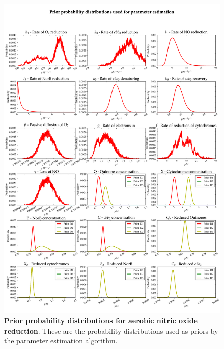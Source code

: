 \begin{figure}[tbp]
 \centering
 \includegraphics[width=15cm, trim=0cm 0cm 0cm 0cm]{./06-noreduction/data/aer-no-priors.pdf}
 \caption[Prior probability distributions for aerobic nitric oxide reduction]{{\bf Prior probability distributions for aerobic nitric oxide reduction}. These are the probability distributions used as priors by the parameter estimation algorithm.
 \label{fig:aer_no_priors}}
\end{figure}

